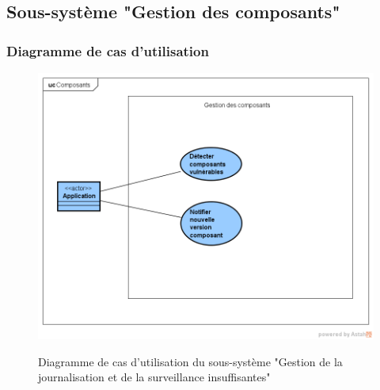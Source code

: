 \subsection{Sous-système "Gestion des composants"}
\subsubsection{Diagramme de cas d'utilisation}
\begin{figure}[H]
	\centering
	\begin{minipage}{12cm}
		\centering
		{\includegraphics[height=0.35\textheight, width=1\textwidth]{fig/Composants-use-case-diagram.png}}
	\end{minipage}
	\caption{Diagramme de cas d'utilisation du sous-système "Gestion de la journalisation et de la surveillance insuffisantes"}
	\label{fig:7.20}
\end{figure}

